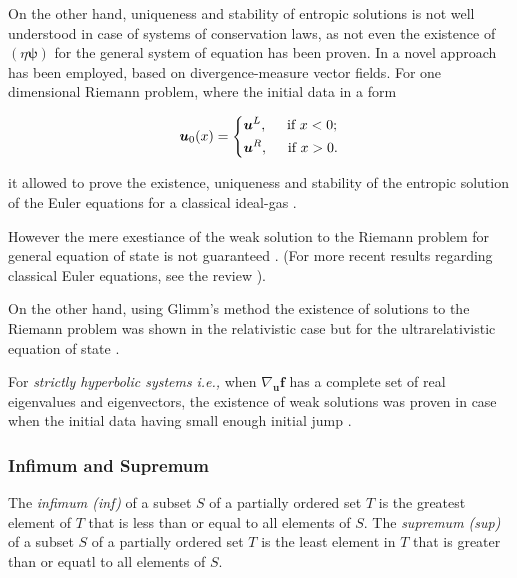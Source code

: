 On the other hand, uniqueness and stability of entropic solutions is not well understood in case of systems of conservation laws, as not even the existence of $(\eta\boldsymbol{\psi})$ for the general system of equation has been proven. 
In \cite{Chen:2009} a novel approach has been employed, based on divergence-measure vector fields. For one dimensional Riemann problem, where the initial data in a form 

\begin{equation}
\boldsymbol{u}_0(x) = 
\begin{dcases}
\boldsymbol{u}^L, \hspace{5mm} \text{if } x<0; \\
\boldsymbol{u}^R, \hspace{5mm} \text{if } x>0.
\end{dcases}
\end{equation}

it allowed to prove the existence, uniqueness and stability of the entropic solution of the Euler equations for a classical ideal-gas \cite{Chen:2003}.

However the mere exestiance of the weak solution to the Riemann problem for general equation of state is not guaranteed \cite{Curtis:1972}. 
(For more recent results regarding classical Euler equations, see the review \cite{Chen:2006}). 

On the other hand, using Glimm’s method \cite{Glimm:1965} the existence of solutions to the Riemann problem was shown in the relativistic case but for the ultrarelativistic equation of state \cite{Smoller:1993}. 

For \textit{strictly hyperbolic systems} \textit{i.e.,} when $\nabla_{\boldsymbol{u}}\boldsymbol{f}$ has a complete set of real eigenvalues and eigenvectors, the existence of weak solutions was proven in case when the initial data having small enough initial jump \cite{Lax:1957}.


\subsubsection*{Infimum and Supremum}

The \textit{infimum (inf)} of a subset $S$ of a partially ordered set $T$ is the greatest element of $T$ that is less than or equal to all elements of $S$.
The \textit{supremum (sup)} of a subset $S$ of a partially ordered set $T$ is the least element in $T$ that is greater than or equatl to all elements of $S$. 

